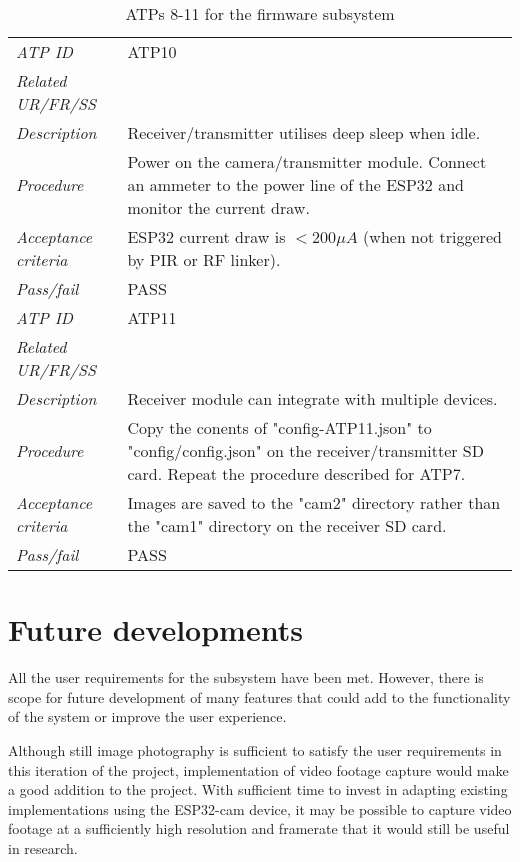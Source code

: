 \documentclass[class=report,11pt,crop=false]{standalone}
\begin{document}
\begin{table}[!ht]
\begin{scriptsize}
\begin{tabularx}{\textwidth}{|p{} X|}
        \textit{ATP ID} & ATP10\\
        \textit{Related UR/FR/SS} & \\
        \textit{Description} & Receiver/transmitter utilises deep sleep when idle.\\
        \textit{Procedure} & Power on the camera/transmitter module. Connect an ammeter to the power line of the ESP32 and monitor the current draw. \\
        \textit{Acceptance criteria} & ESP32 current draw is $ < 200 \mu A $ (when not triggered by PIR or RF linker).\\ 
        \textit{Pass/fail} & PASS\\ \hline

        \textit{ATP ID} & ATP11\\
        \textit{Related UR/FR/SS} & \\
        \textit{Description} & Receiver module can integrate with multiple devices.\\
        \textit{Procedure} & Copy the conents of "config-ATP11.json" to "config/config.json" on the receiver/transmitter SD card. Repeat the procedure described for ATP7. \\
        \textit{Acceptance criteria} & Images are saved to the "cam2" directory rather than the "cam1" directory on the receiver SD card.\\ 
        \textit{Pass/fail} & PASS\\ \hline
        

    \end{tabularx}
    \end{scriptsize}
    \caption{ATPs 8-11 for the firmware subsystem}
    \label{tab:firmware-atps2}
\end{table}

\section{Future developments}

All the user requirements for the subsystem have been met. However, there is scope for future development of many features that could add to the functionality of the system or improve the user experience.

Although still image photography is sufficient to satisfy the user requirements in this iteration of the project, implementation of video footage capture would make a good addition to the project. With sufficient time to invest in adapting existing implementations using the ESP32-cam device, it may be possible to capture video footage at a sufficiently high resolution and framerate that it would still be useful in research.
\end{document}
